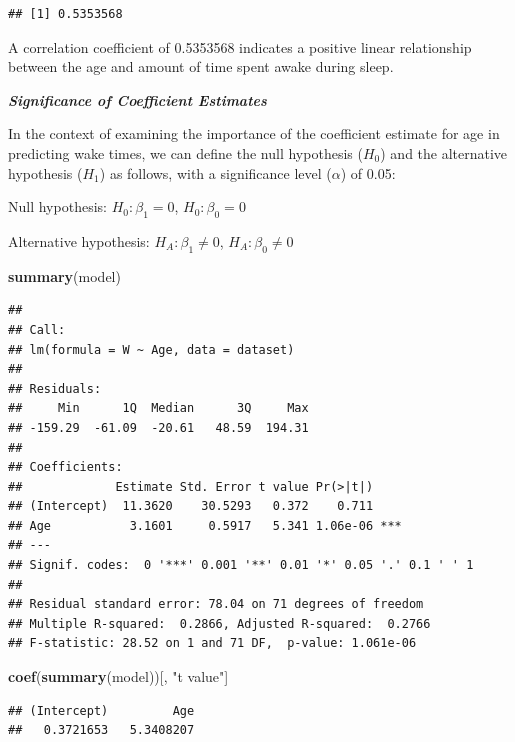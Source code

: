 \documentclass[
]{article}
\newenvironment{Shaded}{\begin{snugshade}}{\end{snugshade}}
\newcommand{\FunctionTok}[1]{\textcolor[rgb]{0.13,0.29,0.53}{\textbf{#1}}}
\newcommand{\NormalTok}[1]{#1}
\newcommand{\StringTok}[1]{\textcolor[rgb]{0.31,0.60,0.02}{#1}}
\begin{document}
\begin{verbatim}
## [1] 0.5353568
\end{verbatim}

A correlation coefficient of 0.5353568 indicates a positive linear
relationship between the age and amount of time spent awake during
sleep.

\textbf{\emph{Significance of Coefficient Estimates}}

In the context of examining the importance of the coefficient estimate
for age in predicting wake times, we can define the null hypothesis
(\(H_0\)) and the alternative hypothesis (\(H_1\)) as follows, with a
significance level (\(\alpha\)) of 0.05:

Null hypothesis: \(H_{0}: \beta_{1} = 0\), \(H_{0}: \beta_{0} = 0\)

Alternative hypothesis: \(H_{A}: \beta_{1} \neq 0\),
\(H_{A}: \beta_{0} \neq 0\)

\begin{Shaded}
\begin{Highlighting}[]
\FunctionTok{summary}\NormalTok{(model)}
\end{Highlighting}
\end{Shaded}

\begin{verbatim}
## 
## Call:
## lm(formula = W ~ Age, data = dataset)
## 
## Residuals:
##     Min      1Q  Median      3Q     Max 
## -159.29  -61.09  -20.61   48.59  194.31 
## 
## Coefficients:
##             Estimate Std. Error t value Pr(>|t|)    
## (Intercept)  11.3620    30.5293   0.372    0.711    
## Age           3.1601     0.5917   5.341 1.06e-06 ***
## ---
## Signif. codes:  0 '***' 0.001 '**' 0.01 '*' 0.05 '.' 0.1 ' ' 1
## 
## Residual standard error: 78.04 on 71 degrees of freedom
## Multiple R-squared:  0.2866, Adjusted R-squared:  0.2766 
## F-statistic: 28.52 on 1 and 71 DF,  p-value: 1.061e-06
\end{verbatim}

\begin{Shaded}
\begin{Highlighting}[]
\FunctionTok{coef}\NormalTok{(}\FunctionTok{summary}\NormalTok{(model))[, }\StringTok{"t value"}\NormalTok{]}
\end{Highlighting}
\end{Shaded}

\begin{verbatim}
## (Intercept)         Age 
##   0.3721653   5.3408207
\end{verbatim}
\end{document}
